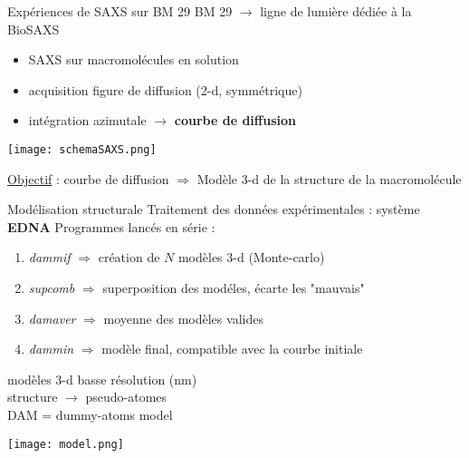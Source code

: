 \documentclass{beamer}
\begin{document}
\begin{frame}{Exp\'eriences de SAXS sur BM 29}
BM 29 $\rightarrow$ ligne de lumi\`ere d\'edi\'ee \`a la BioSAXS\\
\begin{itemize}
  \item SAXS sur macromol\'ecules en solution
  \item acquisition figure de diffusion (2-d, symm\'etrique)
  \item int\'egration azimutale $\rightarrow$ \textbf{courbe de diffusion}
\end{itemize}

\begin{minipage}{\linewidth}
    \begin{flushleft}
    \texttt{[image: schemaSAXS.png]}
    \end{flushleft}
\end{minipage}

\underline{Objectif} : courbe de diffusion $\Rightarrow$ Mod\`ele 3-d 
de la structure de la macromol\'ecule
\end{frame}

\begin{frame}{Mod\'elisation structurale}
Traitement des donn\'ees exp\'erimentales : syst\`eme \textbf{EDNA}
Programmes lanc\'es en s\'erie : 
\begin{enumerate}
  \item \textit{dammif} $\Rightarrow$ cr\'eation de $N$ mod\`eles 3-d 
    (Monte-carlo)
  \item \textit{supcomb} $\Rightarrow$ superposition des mod\'eles, \'ecarte 
    les "mauvais"
  \item \textit{damaver} $\Rightarrow$ moyenne des mod\`eles valides
  \item \textit{dammin} $\Rightarrow$ mod\`ele final, compatible avec la 
    courbe initiale
\end{enumerate}

\begin{minipage}{0.50\linewidth}
    mod\`eles 3-d basse r\'esolution (nm)\\
    structure $\rightarrow$ pseudo-atomes\\
    DAM = dummy-atoms model
\end{minipage}
\begin{minipage}{0.45\linewidth}
    \begin{center}
    \vspace{-0.3cm}
    \hspace{-0.4cm}
    \texttt{[image: model.png]}
    \end{center}
\end{minipage}

\end{frame}
\end{document}
